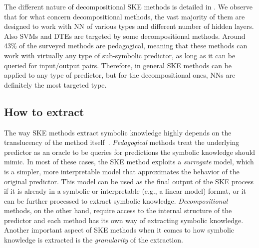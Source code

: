 The different nature of decompositional \gls{SKE} methods is detailed in .
%
We observe that for what concern decompositional methods, the vast majority of them are designed to work with \gls{NN} of various types and different number of hidden layers.
%
Also \glspl{SVM} and \glspl{DTE} are targeted by some decompositional methods.
%
Around 43\% of the surveyed methods are pedagogical, meaning that these methods can work with virtually any type of sub-symbolic predictor, as long as it can be queried for input/output pairs.
%
Therefore, in general \gls{SKE} methods can be applied to any type of predictor, but for the decompositional ones, \glspl{NN} are definitely the most targeted type.


\subsection{How to extract}\label{subsec:how-to-extract}
%
The way \gls{SKE} methods extract symbolic knowledge highly depends on the translucency of the method itself~\cite{DBLP:journals/csur/CiattoSAMO24}.
%
\emph{Pedagogical} methods treat the underlying predictor as an oracle to be queries for predictions the symbolic knowledge should mimic.
%
In most of these cases, the \gls{SKE} method exploits a \emph{surrogate} model, which is a simpler, more interpretable model that approximates the behavior of the original predictor.
%
This model can be used as the final output of the \gls{SKE} process if it is already in a symbolic or interpretable (e.g., a linear model) format, or it can be further processed to extract symbolic knowledge.
%
\emph{Decompositional} methods, on the other hand, require access to the internal structure of the predictor and each method has its own way of extracting symbolic knowledge.
%
Another important aspect of \gls{SKE} methods when it comes to how symbolic knowledge is extracted is the \emph{granularity} of the extraction.

